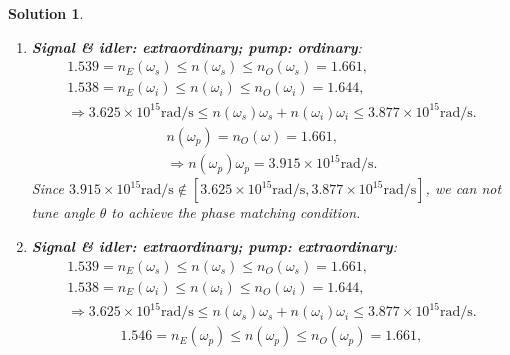 \documentclass[UTF8,10pt,a4paper]{article}
\theoremstyle{Problem}
\theoremstyle{Solution}
\newtheorem*{sol}{Solution}
\begin{document}
\begin{sol}
\begin{enumerate}
\begin{enumerate}
            Under this combination of the input and the output polarization direction, the effective nonlinearity is
            \begin{align}
                d_{eoo}=d_{31}\sin\theta-d_{22}\cos\theta\sin 3\phi,
            \end{align}
            and its maximum is
            \begin{align}
                (d_{eoo})_{\max}=d_{ooe}(\theta=0.3608,\phi=\frac{(2m+1)\pi}{3},m\in\mathbb{Z})=2.135\text{pm}/\text{V}.
            \end{align}
            \item \textbf{Signal \& idler: extraordinary; pump: ordinary}:
            \begin{gather}
                1.539=n_E(\omega_s)\leq n(\omega_s)\leq n_O(\omega_s)=1.661,\\
                1.538=n_E(\omega_i)\leq n(\omega_i)\leq n_O(\omega_i)=1.644,\\
                \Longrightarrow 3.625\times 10^{15}\text{rad}/\text{s}\leq n(\omega_s)\omega_s+n(\omega_i)\omega_i\leq 3.877\times 10^{15}\text{rad}/\text{s}.
            \end{gather}
            \begin{gather}
                n(\omega_p)=n_O(\omega)=1.661,\\
                \Longrightarrow n(\omega_p)\omega_p=3.915\times 10^{15}\text{rad}/\text{s}.
            \end{gather}
            Since $3.915\times 10^{15}\text{rad}/\text{s}\notin[3.625\times 10^{15}\text{rad}/\text{s},3.877\times 10^{15}\text{rad}/\text{s}]$, we can not tune angle $\theta$ to achieve the phase matching condition.\\
        \item \textbf{Signal \& idler: extraordinary; pump: extraordinary}:
            \begin{gather}
                1.539=n_E(\omega_s)\leq n(\omega_s)\leq n_O(\omega_s)=1.661,\\
                1.538=n_E(\omega_i)\leq n(\omega_i)\leq n_O(\omega_i)=1.644,\\
                \Longrightarrow 3.625\times 10^{15}\text{rad}/\text{s}\leq n(\omega_s)\omega_s+n(\omega_i)\omega_i\leq 3.877\times 10^{15}\text{rad}/\text{s}.
            \end{gather}
            \begin{gather}
                1.546=n_E(\omega_p)\leq n(\omega_p)\leq n_O(\omega_p)=1.661,\\

\end{gather}
\end{enumerate}
\end{enumerate}
\end{sol}
\end{document}
